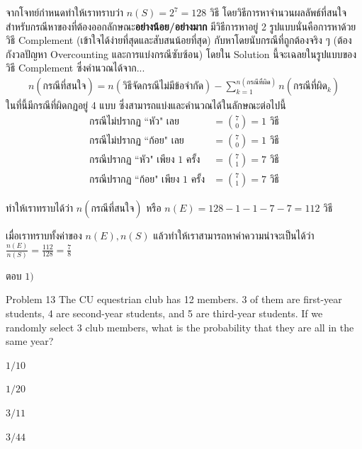 \documentclass[11pt]{scrartcl}
\renewcommand{\binom}[2]{\genfrac{(}{)}{0pt}{0}{#1}{#2}}
\begin{document}
\begin{solutionbox}
  จากโจทย์กำหนดทำให้เราทราบว่า $n(S) = 2^7 = 128$ วิธี โดยวิธีการหาจำนวนผลลัพธ์ที่สนใจสำหรับกรณีหาของที่ต้องออกลักษณะ\textbf{อย่างน้อย}\textbf{/}\textbf{อย่างมาก}
  มีวิธีการหาอยู่ 2 รูปแบบนั่นคือการหาด้วยวิธี Complement (เข้าใจได้ง่ายที่สุดและสับสนน้อยที่สุด) กับหาโดยนับกรณีที่ถูกต้องจริง ๆ (ต้องกังวลปัญหา Overcounting และการแบ่งกรณีซับซ้อน)
  โดยใน Solution นี้จะเฉลยในรูปแบบของวิธี Complement ซึ่งคำนวณได้จาก...
  \begin{align*}
    n(\text{กรณีที่สนใจ}) = n(\text{วิธีจัดกรณีไม่มีข้อจำกัด}) - \sum_{k=1}^{n(\text{กรณีที่ผิด})} n(\text{กรณีที่ผิด}_k)
  \end{align*}
  ในที่นี้มีกรณีที่ผิดกฏอยู่ 4 แบบ ซึ่งสามารถแบ่งและคำนวณได้ในลักษณะต่อไปนี้
  \begin{align*}
    \text{กรณีไม่ปรากฏ ``หัว" เลย} &= \binom{7}{0} = 1 \text{ วิธี} \\
    \text{กรณีไม่ปรากฏ ``ก้อย" เลย} &= \binom{7}{0} = 1 \text{ วิธี} \\
    \text{กรณีปรากฏ ``หัว" เพียง 1 ครั้ง} &= \binom{7}{1} = 7 \text{ วิธี} \\
    \text{กรณีปรากฏ ``ก้อย" เพียง 1 ครั้ง} &= \binom{7}{1} = 7 \text{ วิธี}
  \end{align*}

  ทำให้เราทราบได้ว่า $n(\text{กรณีที่สนใจ})\text{ หรือ } n(E) = 128-1-1-7-7 = 112$ วิธี

  เมื่อเราทราบทั้งค่าของ $n(E), n(S)$ แล้วทำให้เราสามารถหาค่าความน่าจะเป็นได้ว่า $\frac{n(E)}{n(S)} = \frac{112}{128} = \frac{7}{8}$

  ตอบ $\boxed{1)}$
\end{solutionbox}

\newpage

\begin{problembox}{Problem 13}
The CU equestrian club has 12 members. 3 of them are first-year students, 4 are second-year students, and 5 are third-year students. If we randomly select 3 club members, what is the probability that they are all in the same year?
 
\begin{choices}
\item $1/10$
\item $1/20$
\item $3/11$
\item $3/44$
\end{choices}
\end{problembox}
\end{document}
